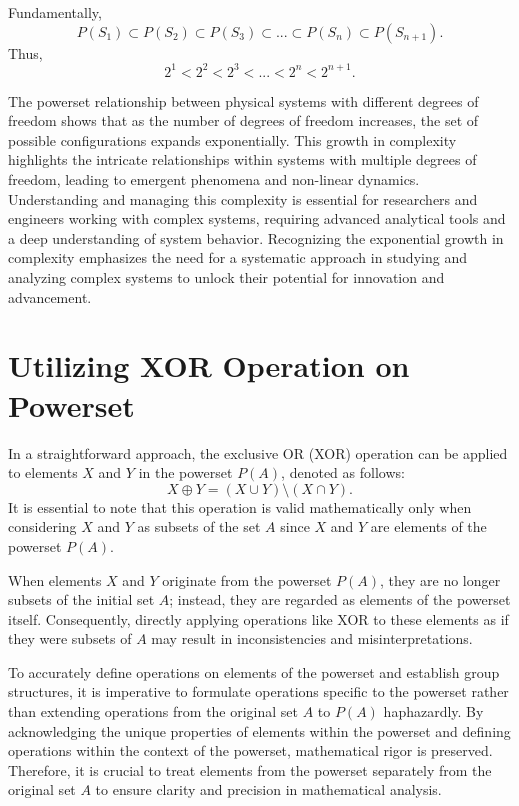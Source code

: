 \documentclass{article}
\begin{document}
Fundamentally,
$$
P(S_{1}) \subset P(S_{2}) \subset P(S_{3}) \subset ... \subset P(S_{n}) \subset P(S_{n+1}) .
$$
Thus, 
$$
2^1 <  2^2  < 2^3 < ... < 2^n < 2^{n+1}.
$$

The powerset relationship between physical systems with different degrees of freedom shows that as the number of degrees of freedom increases, the set of possible configurations expands exponentially. This growth in complexity highlights the intricate relationships within systems with multiple degrees of freedom, leading to emergent phenomena and non-linear dynamics. Understanding and managing this complexity is essential for researchers and engineers working with complex systems, requiring advanced analytical tools and a deep understanding of system behavior. Recognizing the exponential growth in complexity emphasizes the need for a systematic approach in studying and analyzing complex systems to unlock their potential for innovation and advancement.


\section{Utilizing XOR Operation on Powerset}\label{grouppn}

In a straightforward approach, the exclusive OR (XOR) operation can be applied to elements $X$ and $Y$ in the powerset $P(A)$, denoted as follows:
$$
X \oplus Y = (X \cup Y) \setminus (X \cap Y).
$$
It is essential to note that this operation is valid mathematically only when considering $X$ and $Y$ as subsets of the 
set $A$ since $X$ and $Y$ are elements of the powerset $P(A)$.

When elements $X$ and $Y$ originate from the powerset $P(A)$, they are no longer subsets of the initial set $A$; instead, they are regarded as elements of the powerset itself. Consequently, directly applying operations like XOR to these elements as if they were subsets of $A$ may result in inconsistencies and misinterpretations.

To accurately define operations on elements of the powerset and establish group structures, it is imperative to formulate operations specific to the powerset rather than extending operations from the original set $A$ to $P(A)$ haphazardly. By acknowledging the unique properties of elements within the powerset and defining operations within the context of the powerset, mathematical rigor is preserved. Therefore, it is crucial to treat elements from the powerset separately from the original set $A$ to ensure clarity and precision in mathematical analysis.
\end{document}
